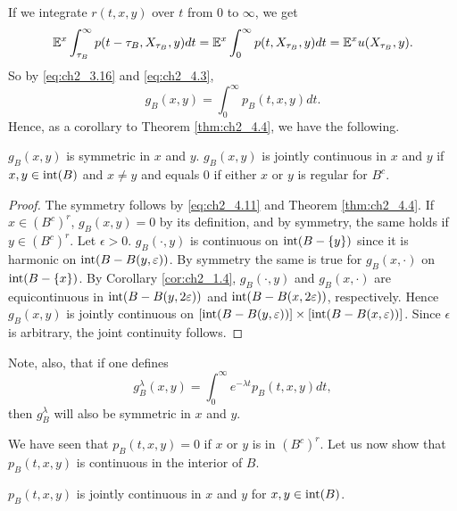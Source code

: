 If we integrate $r(t,x,y)$ over $t$ from $0$ to $\infty$, we get
\mpagebreak
\[
    \mathbb{E}^x \int_{\tau_B}^\infty p(t-\tau_B,X_{\tau_B},y)dt = \mathbb{E}^x \int_0^\infty p(t,X_{\tau_B},y)dt = \mathbb{E}^xu(X_{\tau_B},y).
\]
So by \eqref{eq:ch2_3.16} and \eqref{eq:ch2_4.3},
\begin{equation}\label{eq:ch2_4.11}
    g_B(x,y) = \int_0^\infty p_B(t,x,y)dt.
\end{equation}
Hence, as a corollary to Theorem \ref{thm:ch2_4.4}, we have the following.

\begin{corollary}\label{cor:ch2_4.5}
$g_B(x,y)$ is symmetric in $x$ and $y$. $g_B(x,y)$ is jointly continuous in $x$ and $y$ if $x,y \in \operatorname{int}(B)$ and $x \neq y$ and equals $0$ if either $x$ or $y$ is regular for $B^c$.
\end{corollary}

\begin{proof}
The symmetry follows by \eqref{eq:ch2_4.11} and Theorem \ref{thm:ch2_4.4}. If $x \in (B^c)^r$, $g_B(x,y) = 0$ by its definition, and by symmetry, the same holds if $y \in (B^c)^r$. Let $\epsilon > 0$. $g_B(\cdot,y)$ is continuous on $\operatorname{int}(B - \{y\})$ since it is harmonic on $\operatorname{int}(B - B(y,\varepsilon))$. By symmetry the same is true for $g_B(x,\cdot)$ on $\operatorname{int}(B - \{x\})$. By Corollary \ref{cor:ch2_1.4}, $g_B(\cdot,y)$ and $g_B(x,\cdot)$ are equicontinuous in $\operatorname{int}(B - B(y,2\varepsilon))$ and $\operatorname{int}(B - B(x,2\varepsilon))$, respectively. Hence $g_B(x,y)$ is jointly continuous on $[\operatorname{int}(B - B(y,\varepsilon))] \times [\operatorname{int}(B - B(x,\varepsilon))]$. Since $\epsilon$ is arbitrary, the joint continuity follows.
\end{proof}

Note, also, that if one defines
\[
    g_B^\lambda(x,y) = \int_0^\infty e^{-\lambda t}p_B(t,x,y)dt,
\]
then $g_B^\lambda$ will also be symmetric in $x$ and $y$.



We have seen that $p_B(t,x,y) = 0$ if $x$ or $y$ is in $(B^c)^r$. Let us now show
that $p_B(t,x,y)$ is continuous in the interior of $B$.

\begin{proposition}\label{prop:ch2_4.6}
$p_B(t,x,y)$ is jointly continuous in $x$ and $y$ for $x,y \in \operatorname{int}(B)$.
\end{proposition}


